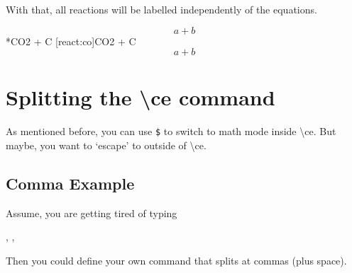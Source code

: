 \documentclass[a4paper,notitlepage,parskip=half]{scrreprt}
\newcommand\macro[1]{\mbox{\ttfamily\textbackslash#1}}
\begin{document}
With that, all reactions will be labelled independently of the equations.

\makeatletter
{}
\renewcommand\thereaction{C\,\thechapter.\arabic{reaction}}
\newcommand\reactiontag%
  {\refstepcounter{reaction}\tag{\thereaction}}
\renewcommand\reaction@[2][]%
  {\begin{equation}\ce{#2}%
  \ifx\@empty#1\@empty\else\label{#1}\fi%
  \reactiontag\end{equation}}
\renewcommand\reaction@nonumber[1]%
  {\begin{equation*}\ce{#1}\end{equation*}}
\renewcommand\reaction%
  {\@ifstar{\reaction@nonumber}{\reaction@}}
\makeatother
\begin{SideBySideExample}[xrightmargin=6.5cm]
  \begin{equation}a+b\end{equation}
  \reaction{CO2 + C}
  \reaction*{CO2 + C}
  \reaction[react:co]{CO2 + C}
  \begin{equation}a+b\end{equation}
\end{SideBySideExample}



\section{Splitting the \macro{ce} command}

As mentioned before, you can use  \verb|$| to switch to math mode inside \macro{ce}. But maybe, you want to `escape' to outside of \macro{ce}.


\subsection{Comma Example}

Assume, you are getting tired of typing

\begin{SideBySideExample}[xrightmargin=4cm]
  , , 
\end{SideBySideExample}

Then you could define your own command that splits at commas (plus space).

\begin{SideBySideExample}[xrightmargin=4cm]
  \newcommand*\cec[1]{\cesplit{{\,\ }{\0}}{#1}}
  \cec{N2, O2, CO2}
\end{SideBySideExample}
\end{document}
